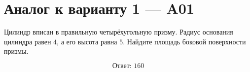 \documentclass[12pt,a4paper]{article}
\begin{document}
\section*{Аналог к варианту 1 — A01}

Цилиндр вписан в правильную четырёхугольную призму. Радиус основания цилиндра равен \(4\), а его высота равна \(5\). Найдите площадь боковой поверхности призмы.

\begin{center}
\end{center}

\[
\boxed{\text{Ответ: }160}
\]
\end{document}
